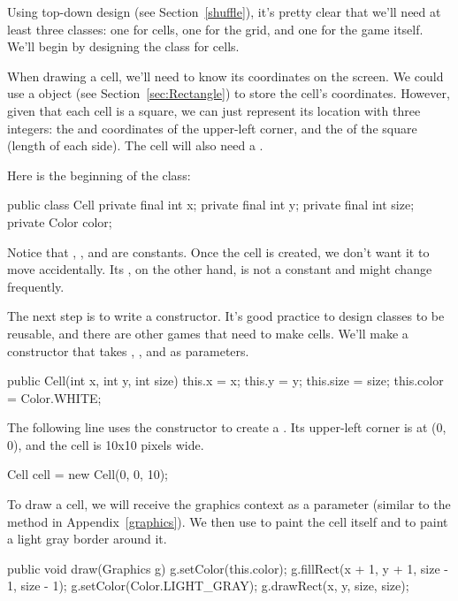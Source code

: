 Using top-down design (see Section~\ref{shuffle}), it's pretty clear that we'll need at least three classes: one for cells, one for the grid, and one for the game itself.
We'll begin by designing the class for cells.

When drawing a cell, we'll need to know its coordinates on the screen.
We could use a  object (see Section~\ref{sec:Rectangle}) to store the cell's coordinates.
However, given that each cell is a square, we can just represent its location with three integers: the  and  coordinates of the upper-left corner, and the  of the square (length of each side).
The cell will also need a .

Here is the beginning of the  class:

\begin{code}
public class Cell {
    private final int x;
    private final int y;
    private final int size;
    private Color color;
}
\end{code}

Notice that , , and  are constants.
Once the cell is created, we don't want it to move accidentally.
Its , on the other hand, is not a constant and might change frequently.

The next step is to write a constructor.
It's good practice to design classes to be reusable, and there are other games that need to make cells.
We'll make a constructor that takes , , and  as parameters.

\begin{code}
public Cell(int x, int y, int size) {
    this.x = x;
    this.y = y;
    this.size = size;
    this.color = Color.WHITE;
}
\end{code}

The following line uses the constructor to create a .
Its upper-left corner is at (0, 0), and the cell is 10x10 pixels wide.

\begin{code}
Cell cell = new Cell(0, 0, 10);
\end{code}

To draw a cell, we will receive the graphics context as a parameter (similar to the  method in Appendix~\ref{graphics}).
We then use  to paint the cell itself and  to paint a light gray border around it.

\begin{code}
public void draw(Graphics g) {
    g.setColor(this.color);
    g.fillRect(x + 1, y + 1, size - 1, size - 1);
    g.setColor(Color.LIGHT_GRAY);
    g.drawRect(x, y, size, size);
}
\end{code}

